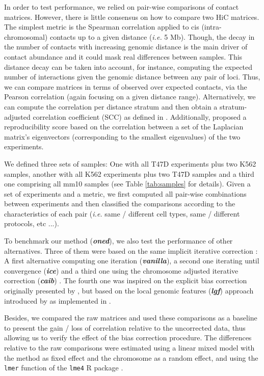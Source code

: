 \documentclass{bioinfo}
\begin{document}
\begin{methods}
In order to test performance, we relied on pair-wise comparisons of contact matrices. However, there is little consensus on how to compare two HiC matrices. The simplest metric is the Spearman correlation applied to cis (intra-chromosomal) contacts up to a given distance (\textit{i.e.} 5 Mb). Though, the decay in the number of contacts with increasing genomic distance is the main driver of contact abundance and it could mask real differences between samples. This distance decay can be taken into account, for instance, computing the expected number of interactions given the genomic distance between any pair of loci. Thus, we can compare matrices in terms of observed over expected contacts, via the Pearson correlation (again focusing on a given distance range). Alternatively, we can compute the correlation per distance stratum and then obtain a stratum-adjusted correlation coefficient (SCC) as defined in \cite{yang2017hicrep}. Additionally, \cite{yan2017hicspector} proposed a reproducibility score based on the correlation between a set of the Laplacian matrix's eigenvectors (corresponding to the smallest eigenvalues) of the two experiments.

We defined three sets of samples: One with all T47D experiments plus two K562 samples, another with all K562 experiments plus two T47D samples and a third one comprising all mm10 samples (see Table \ref{tab:samples} for details). Given a set of experiments and a metric, we first computed all pair-wise combinations between experiments and then classified the comparisons according to the characteristics of each pair (\textit{i.e.} same / different cell types, same / different protocols, etc ...). 

To benchmark our method (\textbf{\textit{oned}}), we also test the performance of other alternatives. Three of them were based on the same implicit iterative correction \citep{imakaev2012iterative}: A first alternative computing one iteration (\textbf{\textit{vanilla}}), a second one iterating until convergence (\textbf{\textit{ice}}) and a third one using the chromosome adjusted iterative correction (\textbf{\textit{caib}}) \citep{wu2016computational}. The fourth one was inspired on the explicit bias correction originally presented by \cite{yaffe2011probabilistic}, but based on the local genomic features (\textbf{\textit{lgf}}) approach introduced by \cite{hu2012hicnorm} as implemented in \cite{servant2012hitc}.

Besides, we compared the raw matrices and used these comparisons as a baseline to present the gain / loss of correlation relative to the uncorrected data, thus allowing us to verify the effect of the bias correction procedure. The differences relative to the raw comparisons were estimated using a linear mixed model with the method as fixed effect and the chromosome as a random effect, and using the \texttt{lmer} function of the \texttt{lme4} R package \citep{bates2015lme4}.


\end{methods}
\end{document}
